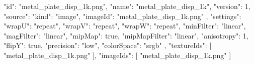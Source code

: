 {
  "id": "metal_plate_disp_1k.png",
  "name": "metal_plate_disp_1k",
  "version": 1,
  "source": {
    "kind": "image",
    "imageId": "metal_plate_disp_1k.png"
  },
  "settings": {
    "wrapU": "repeat",
    "wrapV": "repeat",
    "wrapW": "repeat",
    "minFilter": "linear",
    "magFilter": "linear",
    "mipMap": true,
    "mipMapFilter": "linear",
    "anisotropy": 1,
    "flipY": true,
    "precision": "low",
    "colorSpace": "srgb"
  },
  "textureIds": [
    "metal_plate_disp_1k.png"
  ],
  "imageIds": [
    "metal_plate_disp_1k.png"
  ]
}
